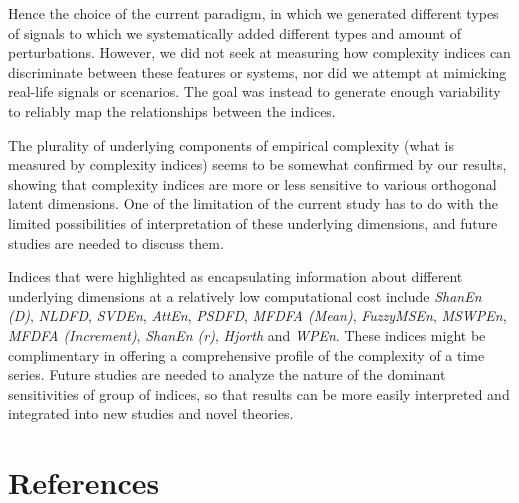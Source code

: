 \documentclass[
  man]{apa6}
\begin{document}
Hence the choice of the current paradigm, in which we generated different types of signals to which we systematically added different types and amount of perturbations. However, we did not seek at measuring how complexity indices can discriminate between these features or systems, nor did we attempt at mimicking real-life signals or scenarios. The goal was instead to generate enough variability to reliably map the relationships between the indices.

The plurality of underlying components of empirical complexity (what is measured by complexity indices) seems to be somewhat confirmed by our results, showing that complexity indices are more or less sensitive to various orthogonal latent dimensions. One of the limitation of the current study has to do with the limited possibilities of interpretation of these underlying dimensions, and future studies are needed to discuss them.

Indices that were highlighted as encapsulating information about different underlying dimensions at a relatively low computational cost include \emph{ShanEn (D)}, \emph{NLDFD}, \emph{SVDEn}, \emph{AttEn}, \emph{PSDFD}, \emph{MFDFA (Mean)}, \emph{FuzzyMSEn}, \emph{MSWPEn}, \emph{MFDFA (Increment)}, \emph{ShanEn (r)}, \emph{Hjorth} and \emph{WPEn}. These indices might be complimentary in offering a comprehensive profile of the complexity of a time series. Future studies are needed to analyze the nature of the dominant sensitivities of group of indices, so that results can be more easily interpreted and integrated into new studies and novel theories.

\newpage

\hypertarget{references}{%
\section{References}\label{references}}
\end{document}
